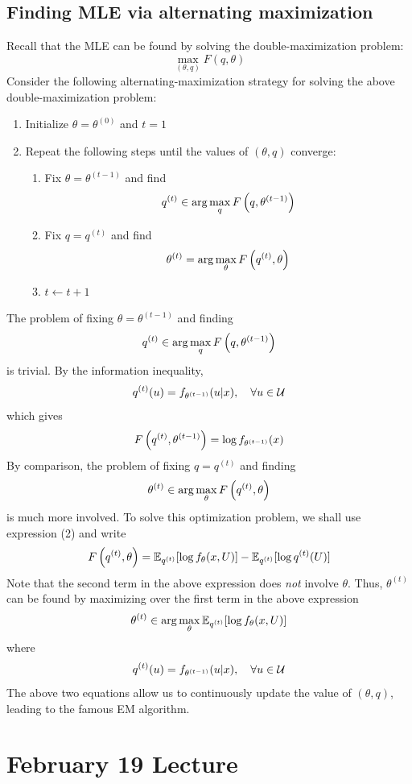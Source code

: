 \documentclass[11pt]{book}
\begin{document}
\section{Finding MLE via alternating maximization}
Recall that the MLE can be found by solving the double-maximization problem: 
\[
  \max_{(\theta, q)} F(q, \theta) 
\]
Consider the following alternating-maximization strategy for solving the above double-maximization problem: 
\begin{enumerate}
  \item Initialize $\theta = \theta^{(0)}$ and $t=1$
  \item Repeat the following steps until the values of $(\theta, q)$ converge:
    \begin{enumerate}
      \item Fix $\theta = \theta^{(t-1)}$ and find 
        \[
          q^{(t)} \in \arg\max_{q}F\left( q,\theta^{(t-1)} \right)
        \] 
      \item Fix $q = q^{(t)}$ and find
        \[
          \theta^{(t)} = \arg\max_{\theta}F\left( q^{(t)}, \theta \right)
        \]
      \item $t \leftarrow t + 1$
    \end{enumerate}
\end{enumerate}
The problem of fixing $\theta = \theta^{(t-1)}$ and finding 
\[
  q^{(t)} \in \arg\max_{q}F\left( q,\theta^{(t-1)} \right)
\] 
is trivial. By the information inequality, 
\[
  q^{(t)}(u) = f_{\theta^{(t-1)}} (u|x),\quad\forall u\in\mathcal{U} 
\] 
which gives 
\[
  F\left( q^{(t)}, \theta^{(t-1)} \right) = \log f_{\theta^{(t-1)}}(x)
\]
By comparison, the problem of fixing $q=q^{(t)}$ and finding 
\[
  \theta^{(t)} \in \arg\max_{\theta}F\left( q^{(t)},\theta \right) 
\]  
is much more involved. To solve this optimization problem, we shall use expression (2) and write %
\[
  F\left( q^{(t)}, \theta \right) = \mathbb{E}_{q^{(t)}} [ \log f_\theta(x, U)] - \mathbb{E}_{q^{(t)}} [\log q^{(t)}(U)]
\]
Note that the second term in the above expression does \textit{not} involve $\theta$. Thus, $\theta^{(t)}$ can be found by maximizing
over the first term in the above expression 
\[
  \theta^{(t)} \in \arg\max_{\theta} \mathbb{E}_{q^{(t)}} [\log f_\theta(x, U)] 
\] 
where 
\[
  q^{(t)} (u) = f_{\theta^{(t-1)}} (u | x), \quad\forall u\in\mathcal{U} 
\]
The above two equations allow us to continuously update the value of $(\theta, q)$, leading to the famous EM algorithm.


\chapter{February 19 Lecture}
\end{document}

